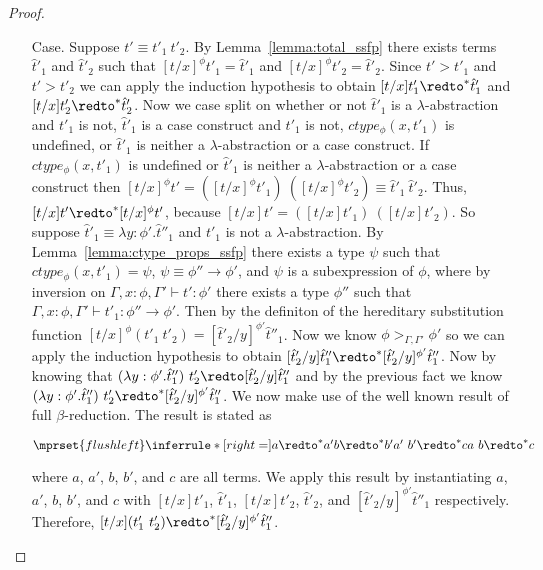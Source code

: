 \begin{proof}
\begin{itemize}
\item[Case.] Suppose $t' \equiv t'_1\ t'_2$.  By Lemma~\ref{lemma:total_ssfp}
  there exists terms $\hat{t}'_1$ and $\hat{t}'_2$
  such that $[t/x]^\phi t'_1 = \hat{t}'_1$ and $[t/x]^\phi t'_2 = \hat{t}'_2$.  Since
  $t' > t'_1$ and $t' > t'_2$ we can apply the induction hypothesis to obtain
  $[t/x]t'_1 \redto^* \hat{t}'_1$ and $[t/x]t'_2 \redto^* \hat{t}'_2$.  Now we case
  split on whether or not $\hat{t}'_1$ is a $\lambda$-abstraction and $t'_1$ is not, $\hat{t}'_1$ is a case construct and
  $t'_1$ is not, $ctype_\phi(x,t'_1)$ is undefined, or $\hat{t}'_1$ is neither a $\lambda$-abstraction or a case construct.  If
  $ctype_\phi(x,t'_1)$ is undefined or $\hat{t}'_1$ is neither a $\lambda$-abstraction or a case construct then 
  $[t/x]^\phi t' = ([t/x]^\phi t'_1)\ ([t/x]^\phi t'_2) \equiv \hat{t}'_1\ \hat{t}'_2$. Thus,
  $[t/x]t' \redto^* [t/x]^\phi t'$, because $[t/x]t' = ([t/x] t'_1)\ ([t/x] t'_2)$.  So suppose 
  $\hat{t}'_1 \equiv \lambda y:\phi'.\hat{t}''_1$ and $t'_1$ is not a $\lambda$-abstraction.  
  By Lemma~\ref{lemma:ctype_props_ssfp} there exists a type $\psi$ such that
  $ctype_\phi(x,t'_1) = \psi$, $\psi \equiv \phi'' \to \phi'$, and $\psi$ is a subexpression
  of $\phi$, where by inversion on $\Gamma,x:\phi,\Gamma' \vdash t':\phi'$ there exists a type
  $\phi''$ such that $\Gamma,x:\phi,\Gamma' \vdash t'_1:\phi'' \to \phi'$.  
  Then by the definiton of the hereditary substitution function $[t/x]^\phi (t'_1\ t'_2) = 
  [\hat{t}'_2/y]^{\phi'} \hat{t}''_1$.
  Now we know $\phi >_{\Gamma,\Gamma'} \phi'$ so 
  we can apply the induction hypothesis to obtain 
  $[\hat{t}'_2/y] \hat{t}''_1 \redto^* [\hat{t}'_2/y]^{\phi'} \hat{t}''_1$.  Now by knowing that 
  $(\lambda y:\phi'.\hat{t}''_1)\ t'_2 \redto [\hat{t}'_2/y] \hat{t}''_1$ and
  by the previous fact we know $(\lambda y:\phi'.\hat{t}''_1)\ t'_2 \redto^* [\hat{t}'_2/y]^{\phi'} \hat{t}''_1$.
  We now make use of the well known result of full $\beta$-reduction.  The
  result is stated as
  \begin{center}
    \begin{math}
      $$\mprset{flushleft}
      \inferrule* [right=] {
        a \redto^* a'
        \\\\
        b \redto^* b'
        \\
        a'\ b' \redto^* c
      }{a\ b \redto^* c}
    \end{math}
  \end{center}
  where $a$, $a'$, $b$, $b'$, and $c$ are all terms.  We apply this
  result by instantiating $a$, $a'$, $b$, $b'$, and $c$ with
  $[t/x] t'_1$, $\hat{t}'_1$, $[t/x] t'_2$, $\hat{t}'_2$, and $[\hat{t}'_2/y]^{\phi'} \hat{t}''_1$ 
  respectively.  Therefore, $[t/x](t'_1\ t'_2) \redto^* [\hat{t}'_2/y]^{\phi'} \hat{t}''_1$.    
  

\end{itemize}
\end{proof}
